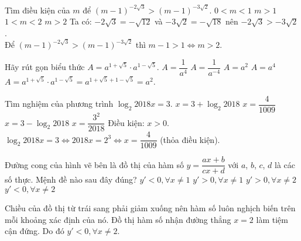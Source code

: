 \begin{ex}%
 Tìm điều kiện của $m$ để $(m-1)^{-2\sqrt{3}} > (m-1)^{-3\sqrt{2}}$.
 \choice
  {$0<m<1$}
  {$m>1$}
  {$1<m<2$}
  {\True $m>2$}
 \loigiai
  {
  Ta có: $-2\sqrt{3} = -\sqrt{12}$ và $-3\sqrt{2} = -\sqrt{18}$ nên $-2\sqrt{3} > -3\sqrt{2}$.\\
  Để $(m-1)^{-2\sqrt{3}} > (m-1)^{-3\sqrt{2}}$ thì $m - 1 > 1 \Leftrightarrow m >2$.
  }
\end{ex}


\begin{ex}%
 Hãy rút gọn biểu thức $A = a^{1+\sqrt{5}} \cdot a^{1-\sqrt{5}}$.
 \choice
  {$A = \dfrac{1}{a^4}$}
  {$A = \dfrac{1}{a^{-4}}$}
  {\True $A = a^2$}
  {$A = a^4$}
 \loigiai
  {
  $A = a^{1+\sqrt{5}} \cdot a^{1-\sqrt{5}} = a^{1+\sqrt{5} + 1-\sqrt{5}} = a^2$.
  }
\end{ex}


\begin{ex}%
 Tìm nghiệm của phương trình $\log_2 2018x = 3$.
 \choice
  {$x = 3 + \log_2 2018$}
  {\True $x = \dfrac{4}{1009}$}
  {$x = 3 - \log_2 2018$}
  {$x = \dfrac{3^2}{2018}$}
 \loigiai
  {
  Điều kiện: $x > 0$.\\
  $\log_2 2018x = 3 \Leftrightarrow 2018x = 2^3 \Leftrightarrow x = \dfrac{4}{1009}$ (thỏa điều kiện).
  }
\end{ex}


\begin{ex}%
 \immini
 {
 Đường cong của hình vẽ bên là đồ thị của hàm số $y = \dfrac{ax+b}{cx+d}$ với $a$, $b$, $c$, $d$ là các số thực. Mệnh đề nào sau đây đúng?
 \motcot
  {$y' < 0, \forall x \neq 1$}
  {$y' > 0, \forall x \neq 1$}
  {$y' > 0, \forall x \neq 2$}
  {\True $y' < 0, \forall x \neq 2$}
  }
  {
  }
 \loigiai
  {
  Chiều của đồ thị từ trái sang phải giảm xuống nên hàm số luôn nghịch biến trên mỗi khoảng xác định của nó. Đồ thị hàm số nhận đường thẳng $x = 2$ làm tiệm cận đứng. Do đó $y' < 0, \forall x \neq 2$.
  }
\end{ex}


